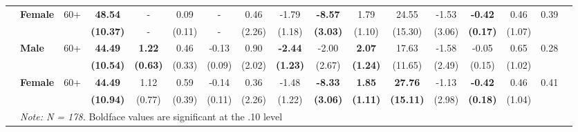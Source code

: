 \documentclass{article}
\begin{document}
\begin{table}[!htbp]
\begin{tabular}{@{\extracolsep{.05pt}}|clccccccccccccccc|}
& \textbf{Female} & 60+ & \textbf{48.54} & - & 0.09 & - & 0.46 & -1.79 & \textbf{-8.57} & 1.79 & 24.55 & -1.53 & \textbf{-0.42} & 0.46 & 0.39 & \\
&  & & \textbf{(10.37)} & - & (0.11) & - & (2.26) & (1.18) & \textbf{(3.03)} & (1.10) & (15.30) & (3.06) & \textbf{(0.17)} & (1.07) & & \\
& \textbf{Male} & 60+ & \textbf{44.49} & \textbf{1.22} & 0.46 & -0.13 & 0.90 & \textbf{-2.44} & -2.00 & \textbf{2.07} & 17.63 & -1.58 & -0.05 & 0.65 & 0.28 & \\
&  & & \textbf{(10.54)} & \textbf{(0.63)} & (0.33) & (0.09) & (2.02) & \textbf{(1.23)} & (2.67) & \textbf{(1.24)} & (11.65) & (2.49) & (0.15) & (1.02) & & \\
& \textbf{Female} & 60+ & \textbf{44.49} & 1.12 & 0.59 & -0.14 & 0.36 & -1.48 & \textbf{-8.33} & \textbf{1.85} & \textbf{27.76} & -1.13 & \textbf{-0.42} & 0.46 & 0.41 & \\
&  & & \textbf{(10.94)} & (0.77) & (0.39) & (0.11) & (2.26) & (1.22) & \textbf{(3.06)} & \textbf{(1.11)} & \textbf{(15.11)} & (2.98) & \textbf{(0.18)} & (1.04) & & \\
\cline{2-16}
& \multicolumn{10}{l}{\textit{Note: N = 178.} Boldface values are significant at the .10 level} &&&&&&\\
\hline 
\end{tabular} 
\end{table} 
\end{document}
